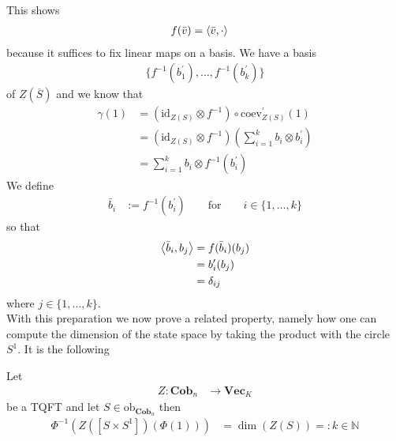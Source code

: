 This shows
\begin{align*}
  f(\bar{v})
  &=
  \Braket{\bar{v},\cdot}
\end{align*}
because it suffices to fix linear maps on a basis. We have a basis
\begin{align*}
  \lbrace
    f^{-1}(b_{1}^{\prime})
    ,
    \ldots
    ,
    f^{-1}(b_{k}^{\prime})
  \rbrace
\end{align*}
of $Z(\overline{S})$ and we know that
\begin{align*}
  \gamma(1)
  &=
  \left(
    \mathrm{id}_{Z(S)}
    \otimes
    f^{-1}
  \right)
  \circ
  \mathrm{coev}_{Z(S)}^{\prime}(1)
  \\
  &=
  \left(
    \mathrm{id}_{Z(S)}
    \otimes
    f^{-1}
  \right)
  \left(
    \sum_{i = 1}^{k}
    b_{i}
    \otimes
    b_{i}^{\prime}
  \right)
  \\
  &=
  \sum_{i = 1}^{k}
  b_{i}
  \otimes
  f^{-1}(b_{i}^{\prime})
\end{align*}
We define
\begin{align*}
  \bar{b}_{i}
  &:=
  f^{-1}(b_{i}^{\prime})
  \qquad
  \text{for}
  \qquad
  i
  \in
  \lbrace
    1
    ,
    \ldots
    ,
    k
  \rbrace
\end{align*}
so that
\begin{align*}
  \Braket{\bar{b}_{i},b_{j}}
  &=
  f(\bar{b}_{i})(b_{j})
  \\
  &=
  b_{i}^{\prime}(b_{j})
  \\
  &=
  \delta_{ij}
\end{align*}
where $j \in \lbrace 1,\ldots,k\rbrace$.
\\
With this preparation we now prove a related property, namely how one can compute the dimension of the state space by taking the product with the circle $S^{1}$. It is the following
\\
\begin{cor}
\label{cor:dimS1}
Let
\begin{align*}
  Z
  \colon
  \mathbf{Cob}_{n}
  &\to
  \mathbf{Vec}_{K}
\end{align*}
be a TQFT and let $S \in \mathrm{ob}_{\mathbf{Cob}_{n}}$ then
\begin{align*}
  \Phi^{-1}
  \left(
    Z([S \times S^{1}])
    \left(
      \Phi(1)
    \right)
  \right)
  &=
  \dim(Z(S))
  =:
  k
  \in
  \mathbb{N}
\end{align*}
\end{cor}
